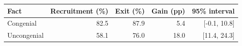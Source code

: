 \begin{tabular}{lrrrr}
\toprule
Fact & Recruitment (\%) & Exit (\%) & Gain (pp) & 95\% interval \\
\midrule
Congenial & 82.5 & 87.9 & 5.4 & [-0.1, 10.8] \\
Uncongenial & 58.1 & 76.0 & 18.0 & [11.4, 24.3] \\
\bottomrule
\end{tabular}
